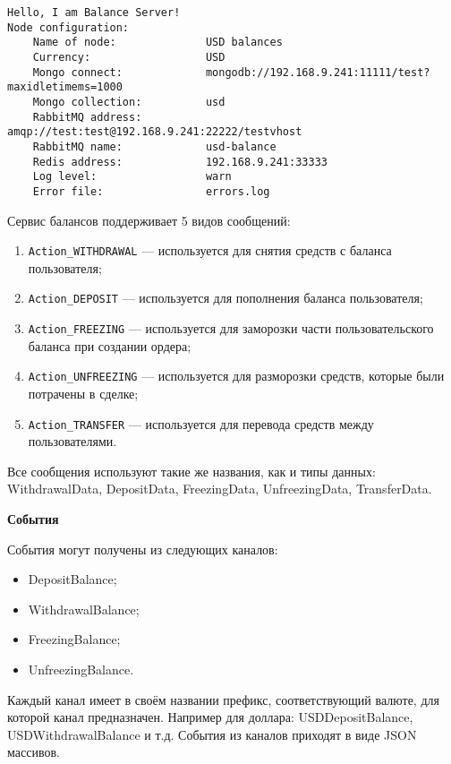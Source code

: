 \begin{lstlisting}
Hello, I am Balance Server!
Node configuration: 
	Name of node:              USD balances
	Currency:                  USD
	Mongo connect:             mongodb://192.168.9.241:11111/test?maxidletimems=1000
	Mongo collection:          usd
	RabbitMQ address:          amqp://test:test@192.168.9.241:22222/testvhost
	RabbitMQ name:             usd-balance
	Redis address:             192.168.9.241:33333
	Log level:                 warn
	Error file:                errors.log
\end{lstlisting}

Сервис балансов поддерживает 5 видов сообщений:

\begin{enumerate}
    \item \lstinline{Action_WITHDRAWAL} — используется для снятия средств с баланса пользователя;
    \item \lstinline{Action_DEPOSIT} — используется для пополнения баланса пользователя;
    \item \lstinline{Action_FREEZING} — используется для заморозки части пользовательского баланса при создании ордера;
    \item \lstinline{Action_UNFREEZING} — используется для разморозки средств, которые были потрачены в сделке;
    \item \lstinline{Action_TRANSFER} — используется для перевода средств между пользователями.
\end{enumerate}

Все сообщения используют такие же названия, как и типы данных: WithdrawalData, DepositData, FreezingData, UnfreezingData, TransferData.

\textbf{События}

События могут получены из следующих каналов:

\begin{itemize}
    \item DepositBalance;
    \item WithdrawalBalance;
    \item FreezingBalance;
    \item UnfreezingBalance.
\end{itemize}

Каждый канал имеет в своём названии префикс, соответствующий валюте, для которой канал предназначен. Например для доллара: USDDepositBalance, USDWithdrawalBalance и т.д. События из каналов приходят в виде JSON массивов.

